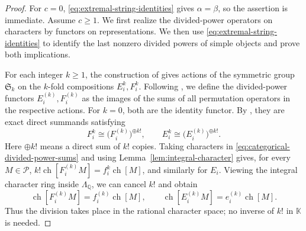 \documentclass[12pt,reqno,a4paper]{amsart}
\numberwithin{equation}{section}
\numberwithin{figure}{section}
\theoremstyle{plain}
\theoremstyle{definition}
\newcommand{\Sym}{\mathfrak S}
\newcommand{\cP}{\mathcal P}
\DeclareMathOperator{\ch}{ch}
\begin{document}
\begin{proof}
For $c=0$, \eqref{eq:extremal-string-identities} gives
$\alpha=\beta$, so the assertion is immediate.  Assume $c\geq1$.
We first realize the divided-power operators on characters by
functors on representations.  We then use
\eqref{eq:extremal-string-identities} to identify the last nonzero
divided powers of simple objects and prove both implications.

For each integer $k\geq1$, the construction of
\cite[Theorem~4]{HTY} gives actions of the symmetric group $\Sym_k$
on the $k$-fold compositions $E_i^k,F_i^k$.
Following \cite[Sections~3.1.4 and~5.2.2]{CR}, we define the
divided-power functors $E_i^{(k)},F_i^{(k)}$ as the images of the
sums of all permutation operators in the respective actions.
For $k=0$, both are the identity functor.
By \cite[Lemma~5.13]{CR}, they are exact direct summands satisfying
\begin{equation}\label{eq:categorical-divided-power-sums}
F_i^k\cong\bigl(F_i^{(k)}\bigr)^{\oplus k!},
\qquad
E_i^k\cong\bigl(E_i^{(k)}\bigr)^{\oplus k!}.
\end{equation}
Here $\oplus k!$ means a direct sum of $k!$ copies.  Taking
characters in \eqref{eq:categorical-divided-power-sums} and using
Lemma~\ref{lem:integral-character} gives, for every $M\in\cP$,
$k!\ch[F_i^{(k)}M]=f_i^k\ch[M]$, and similarly for $E_i$.
Viewing the integral character ring inside $\Lambda_{\mathbb Q}$,
we can cancel $k!$ and obtain
\begin{equation}\label{eq:categorical-divided-power-characters}
\ch[F_i^{(k)}M]=f_i^{(k)}\ch[M],
\qquad
\ch[E_i^{(k)}M]=e_i^{(k)}\ch[M].
\end{equation}
Thus the division takes place in the rational character space;
no inverse of $k!$ in $\mathbb K$ is needed.


\end{proof}
\end{document}
